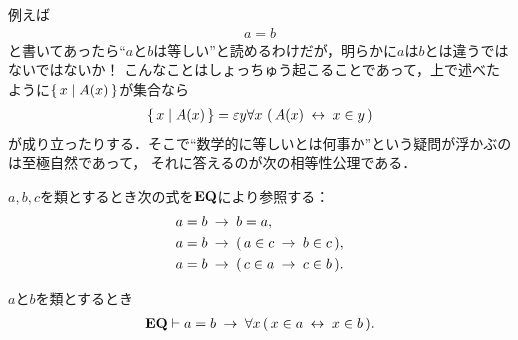 	例えば
	\begin{align}
		a = b
	\end{align}
	と書いてあったら``$a$と$b$は等しい''と読めるわけだが，明らかに$a$は$b$とは違うではないではないか！
	こんなことはしょっちゅう起こることであって，上で述べたように$\{\, x \mid A(x)\, \}$が集合なら
	\begin{align}
		\{\, x \mid A(x)\, \} = \varepsilon y \forall x\, \left(\, A(x) \hspace{0.25em}\leftrightarrow\hspace{0.25em} x \in y\, \right)
	\end{align}
	が成り立ったりする．そこで``数学的に等しいとは何事か''という疑問が浮かぶのは至極自然であって，
	それに答えるのが次の相等性公理である．
	
	\begin{screen}
		\begin{axm}[相等性公理]
			$a,b,c$を類とするとき次の式を$\mbox{{\bf EQ}}$により参照する：
			\begin{align}
				a = b &\hspace{0.25em}\rightarrow\hspace{0.25em} b = a,  \\
				a = b &\hspace{0.25em}\rightarrow\hspace{0.25em} (\, a \in c \hspace{0.25em}\rightarrow\hspace{0.25em} b \in c\, ), \\
				a = b &\hspace{0.25em}\rightarrow\hspace{0.25em} (\, c \in a \hspace{0.25em}\rightarrow\hspace{0.25em} c \in b\, ). 
			\end{align}
		\end{axm}
	\end{screen}
	
	\begin{screen}
		\begin{thm}[外延性の公理の逆も成り立つ]
		\label{thm:inverse_of_axiom_of_extensionality}
			$a$と$b$を類とするとき
			\begin{align}
				\mbox{{\bf EQ}} \vdash 
				a = b \hspace{0.25em}\rightarrow\hspace{0.25em} \forall x\, (\, x \in a  \hspace{0.25em}\leftrightarrow\hspace{0.25em} x \in b\, ).
			\end{align}
		\end{thm}
	\end{screen}
	
